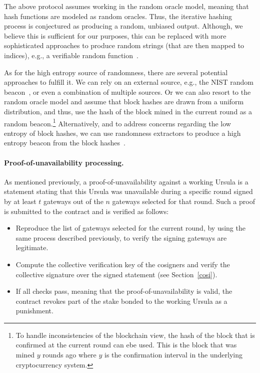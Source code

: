 The above protocol assumes working in the random oracle model, meaning that hash functions are modeled as random oracles. Thus, the iterative hashing process is conjectured as producing a random, unbiased output. Although, we believe this is sufficient for our purposes, this can be replaced with more sophisticated approaches to produce random strings (that are then mapped to indices), e.g., a verifiable random function~\cite{micali1999verifiable}. 


As for the high entropy source of randomness, there are several potential approaches to fulfill it. We can rely on an external source, e.g., the NIST random beacon~\cite{nist-beacon}, or even a combination of multiple sources. Or we can also resort to the random oracle model and assume that block hashes are drawn from a uniform distribution, and thus, use the hash of the block mined in the current round as a random beacon.\footnote{To handle inconsistencies of the blockchain view, the hash of the block that is confirmed at the current round can ebe used. This is the block that was mined $y$ rounds ago where $y$ is the confirmation interval in the underlying cryptocurrency system.} Alternatively, and to address concerns regarding the low entropy of block hashes, we can use randomness extractors to produce a high entropy beacon from the block hashes~\cite{bonneau2015bitcoin}.


\paragraph{\bf Proof-of-unavailability processing.} 
As mentioned previously, a proof-of-unavailability against a working Ursula is a statement stating that this Ursula was unavailable during a specific round signed by at least $t$ gateways out of the $n$ gateways selected for that round. Such a proof is submitted to the \stakeescrow contract and is verified as follows:
\begin{itemize}
\item Reproduce the list of gateways selected for the current round, by using the same process described previously, to verify the signing gateways are legitimate.

\item Compute the collective verification key of the cosigners and verify the collective signature over the signed statement (see Section~\ref{cosi}).

\item If all checks pass, meaning that the proof-of-unavailability is valid, the \stakeescrow contract revokes part of the stake bonded to the working Ursula as a punishment.
\end{itemize}


